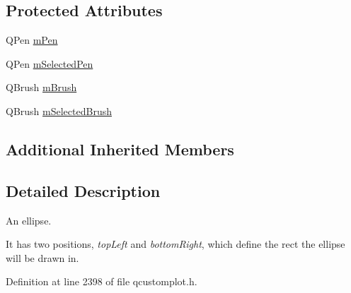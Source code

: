 \subsection*{Protected Attributes}
\begin{DoxyCompactItemize}
\item 
Q\-Pen \hyperlink{class_q_c_p_item_ellipse_a16ad9389acf028a7e4ac8fd7a550b2e4}{m\-Pen}
\item 
Q\-Pen \hyperlink{class_q_c_p_item_ellipse_a57b047abfce6f1a84ed46ca668c90e21}{m\-Selected\-Pen}
\item 
Q\-Brush \hyperlink{class_q_c_p_item_ellipse_a6fa59478cd3ad1b10e6c1f6cedc84bd6}{m\-Brush}
\item 
Q\-Brush \hyperlink{class_q_c_p_item_ellipse_a2e49d5547478aa36910ed8a2dcc8a5c0}{m\-Selected\-Brush}
\end{DoxyCompactItemize}
\subsection*{Additional Inherited Members}


\subsection{Detailed Description}
An ellipse. 

 It has two positions, {\itshape top\-Left} and {\itshape bottom\-Right}, which define the rect the ellipse will be drawn in. 

Definition at line 2398 of file qcustomplot.\-h.



